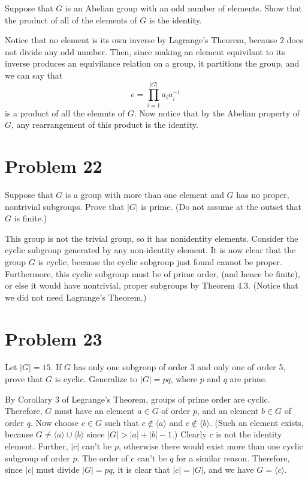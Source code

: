\documentclass[12pt]{article}
\begin{document}
Suppose that $G$ is an Abelian group with an odd number of elements.
Show that the product of all of the elements of $G$ is the identity.

Notice that no element is its own inverse by Lagrange's Theorem,
because 2 does not divide any odd number.  Then, since making
an element equivilant to its inverse produces an equivilance
relation on a group, it partitions the group, and
we can say that
\begin{equation*}
e = \prod_{i=1}^{|G|} a_ia_i^{-1}
\end{equation*}
is a product of all the elemnts of $G$.  Now notice that by the
Abelian property of $G$, any rearrangement of this product is the identity.

\section*{Problem 22}

Suppose that $G$ is a group with more than one element and $G$ has no
proper, nontrivial subgroups.  Prove that $|G|$ is prime.  (Do not assume
at the outset that $G$ is finite.)

This group is not the trivial group, so it has nonidentity elements.
Consider the cyclic subgroup generated by any non-identity element.
It is now clear that the group $G$ is cyclic, because the cyclic subgroup
just found cannot be proper.  Furthermore, this cyclic subgroup must
be of prime order, (and hence be finite), or else it would have nontrivial, proper subgroups
by Theorem 4.3.  (Notice that we did not need Lagrange's Theorem.)

\section*{Problem 23}

Let $|G|=15$.  If $G$ has only one subgroup of order 3 and only one of order 5,
prove that $G$ is cyclic.  Generalize to $|G|=pq$, where $p$ and $q$ are prime.

By Corollary 3 of Legrange's Theorem, groups of prime order are cyclic.
Therefore, $G$ must have an element $a\in G$ of order $p$,
and an element $b\in G$ of order $q$.  Now choose $c\in G$ such that $c\not\in\langle a\rangle$
and $c\not\in\langle b\rangle$.  (Such an element exists, because $G\neq\langle a\rangle\cup\langle b\rangle$ since
$|G|>|a|+|b|-1$.)
Clearly $c$ is not the identity element.
Further, $|c|$ can't be $p$, otherwise there would exist more than one cyclic
subgroup of order $p$.  The order of $c$ can't be $q$ for a similar reason.
Therefore, since $|c|$ must divide $|G|=pq$, it is clear that $|c|=|G|$,
and we have $G=\langle c\rangle$.
\end{document}
